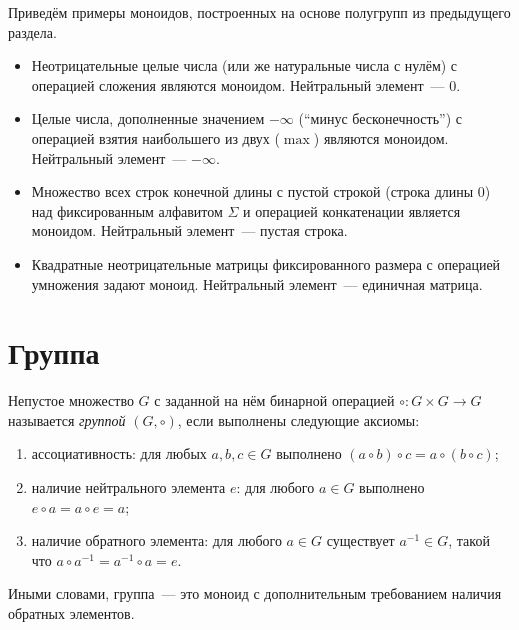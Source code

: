 \begin{example}
    Приведём примеры моноидов, построенных на основе полугрупп из предыдущего раздела.
    \begin{itemize}
        \item Неотрицательные целые числа (или же натуральные числа с нулём) с операцией сложения являются моноидом.
              Нейтральный элемент~--- $0$.
        \item Целые числа, дополненные значением $-\infty$ (\enquote{минус бесконечность}) с операцией взятия наибольшего из двух ($\max$) являются моноидом.
              Нейтральный элемент~--- $-\infty$.
        \item Множество всех строк конечной длины с пустой строкой (строка длины 0) над фиксированным алфавитом $\Sigma$ и операцией конкатенации является моноидом.
              Нейтральный элемент~--- пустая строка.
        \item Квадратные неотрицательные матрицы%
               фиксированного размера с операцией умножения задают моноид.
              Нейтральный элемент~--- единичная матрица.
    \end{itemize}
\end{example}

\section{Группа}

\begin{definition}[Группа]
    Непустое%
    множество $G$ с заданной на нём бинарной операцией $\circ: {G} \times {G} \to {G}$ называется \emph{группой} $(G ,\circ)$, если выполнены следующие аксиомы:
    \begin{enumerate}
        \item ассоциативность: для любых $a, b, c \in G$ выполнено $(a \circ b) \circ c = a \circ (b \circ c)$;
        \item наличие нейтрального элемента $e$: для любого $a \in G$ выполнено $e \circ a = a \circ e = a$;
        \item наличие обратного элемента: для любого $a \in G$ существует $a^{-1} \in G$, такой что $a \circ a^{-1} = a^{-1} \circ a = e$.
    \end{enumerate}
    Иными словами, группа~--- это моноид с дополнительным требованием наличия обратных элементов.
\end{definition}

